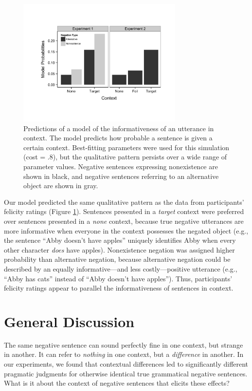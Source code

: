 \documentclass[10pt,letterpaper]{article}
\begin{document}
\begin{figure}[t]
\begin{center} 
\includegraphics[width=3.25in]{figures/model_predictions.pdf}
\caption{\label{fig:model} Predictions of a model of the informativeness of an utterance in context.  The model predicts how probable a sentence is given a certain context.  Best-fitting parameters were used for this simulation (cost = .8), but the qualitative pattern persists over a wide range of parameter values.  Negative sentences expressing nonexistence are shown in black, and negative sentences referring to an alternative object are shown in gray.}
\end{center} 
\end{figure}

Our model predicted the same qualitative pattern as the data from participants' felicity ratings (Figure \ref{fig:model}).  Sentences presented in a \emph{target} context were preferred over sentences presented in a \emph{none} context, because true negative utterances are more informative when everyone in the context possesses the negated object (e.g., the sentence ``Abby doesn't have apples'' uniquely identifies Abby when every other character \emph{does} have apples).  Nonexistence negation was assigned higher probability than alternative negation, because alternative negation could be described by an equally informative---and less costly---positive utterance (e.g., ``Abby has cats'' instead of ``Abby doesn't have apples'').  Thus, participants' felicity ratings appear to parallel the informativeness of sentences in context.  

\section{General Discussion}

The same negative sentence can sound perfectly fine in one context, but strange in another.  It can refer to \emph{nothing} in one context, but a \emph{difference} in another. In our experiments, we found that contextual differences led to significantly different pragmatic judgments for otherwise identical true grammatical negative sentences.  What is it about the context of negative sentences that elicits these effects?  
\end{document}

